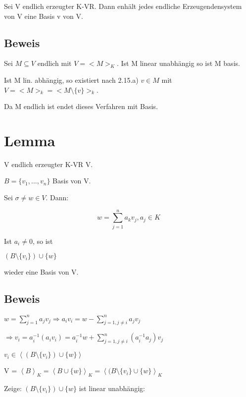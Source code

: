 \documentclass[a4paper, openany]{book}
\begin{document}
    Sei V endlich erzeugter K-VR. Dann enhält jedes endliche Erzeugendensystem von V eine Basis v von V.

    \subsection{Beweis}

    Sei $M \subseteq V$ endlich mit $V = <M>_K$. Ist M linear unabhängig so ist M basis. 

    Ist M lin. abhängig, so existiert nach 2.15.a) $v \in M$ mit $V = <M>_k = <M \setminus{\{ v \}}>_k$.

    Da M endlich ist endet dieses Verfahren mit Basis.

    \section{Lemma}

    V endlich erzeugter K-VR V.

    $B = \{v_1,...,v_n\}$ Basis von V.

    Sei $\sigma \neq w \in V$. Dann:

    \begin{equation}
      w = \sum_{j=1}^n a_kv_j, a_j \in K
    \end{equation}

    Ist $a_i \neq 0$, so ist 

    \begin{center}
      $(B \setminus \{v_i\}) \cup \{w\}$
    \end{center}

    wieder eine Basis von V.

    \subsection{Beweis}

    $w = \sum_{j=1}^n a_jv_j \Rightarrow a_iv_i = w - \sum_{j=1, j \neq i}^{n} a_jv_j$

    $\Rightarrow v_i = a_i^{-1}(a_iv_i) = a_i^{-1}w + \sum_{j=1, j \neq i}^n (a_i^{-1} a_j) v_j$

    $v_i \in \left \langle (B \setminus \{v_i\}) \cup \{w\} \right \rangle$

    V = $\left \langle B \right \rangle_K = \left \langle B \cup \{w\} \right \rangle_K = \left \langle (B \setminus \{v_i\} \cup \{w\} \right \rangle_K$

    Zeige: $(B \setminus \{v_i\}) \cup \{w\}$ ist linear unabhängig:
\end{document}
